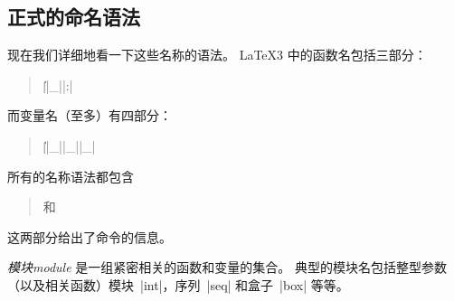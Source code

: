 \documentclass[full]{l3doc}
\begin{document}
\subsection{正式的命名语法}
%

现在我们详细地看一下这些名称的语法。
\LaTeX3 中的函数名包括三部分：
\begin{quote}
    |\||_||:|
\end{quote}
而变量名（至多）有四部分：
\begin{quote}
    |\||_||_||_|
\end{quote}

%

所有的名称语法都包含
\begin{quote}
     和 
\end{quote}
这两部分给出了命令的信息。

%
%
\emph{模块module} 是一组紧密相关的函数和变量的集合。
典型的模块名包括整型参数（以及相关函数）模块~|int|，序列~|seq| 和盒子~|box| 等等。

%
\end{document}

